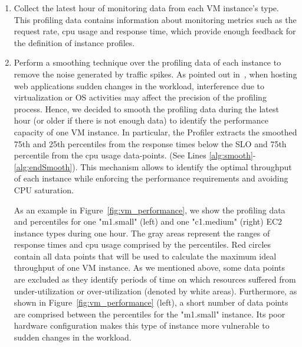 \begin{enumerate}
\item Collect the latest hour of monitoring data from each VM instance's type. This profiling data contains information about monitoring metrics such as the request rate, cpu usage and response time, which provide enough feedback for the definition of instance profiles. 

\item Perform a smoothing technique over the profiling data of each instance to remove the noise generated by traffic spikes. As pointed out in~\cite{gandhi_hybrid_2012}, when hosting web applications sudden changes in the workload, interference due to virtualization or OS activities may affect the precision of the profiling process. Hence, we decided to smooth the profiling data during the latest hour (or older if there is not enough data) to identify the performance capacity of one VM instance. In particular, the Profiler extracts the smoothed 75th and 25th percentiles from the response times below the SLO and 75th percentile from the cpu usage data-points. (See Lines \ref{alg:smooth}-\ref{alg:endSmooth}). This mechanism allows to identify the optimal throughput of each instance while enforcing the performance requirements and avoiding CPU saturation. 

As an example in Figure~\ref{fig:vm_performance}, we show the profiling data and percentiles for one "m1.small" (left) and one "c1.medium" (right) EC2 instance types during one hour. The gray areas represent the ranges of response times and cpu usage comprised by the percentiles. Red circles contain all data points that will be used to calculate the maximum ideal throughput of one VM instance. As we mentioned above, some data points are excluded as they identify periods of time on which resources suffered from under-utilization or over-utilization (denoted by white areas). Furthermore, as shown in Figure~\ref{fig:vm_performance} (left), a short number of data points are comprised between the percentiles for the "m1.small" instance. Its poor hardware configuration makes this type of instance more vulnerable to sudden changes in the workload.




\end{enumerate}
